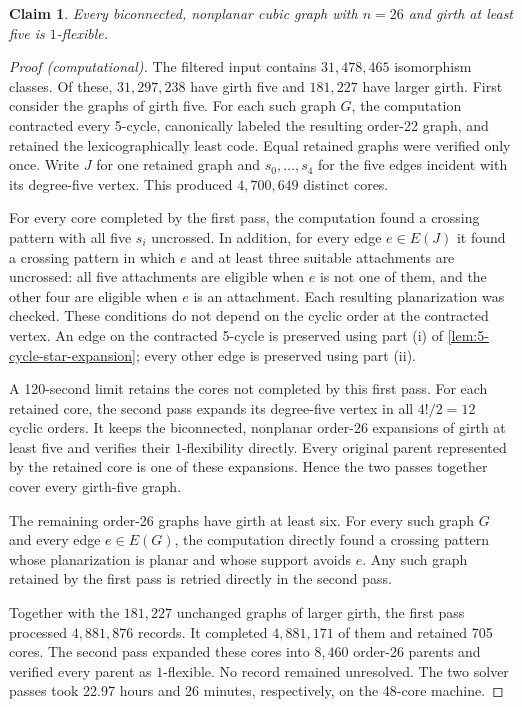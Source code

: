 \documentclass[a4paper,11pt]{article}
\theoremstyle{plain}
\newtheorem{claim}{Claim}
\theoremstyle{definition}  %
\begin{document}
\begin{claim}\label{clm:flexible26}
    Every biconnected, nonplanar cubic graph with $n=26$ and girth
    at least five is $1$-flexible.
\end{claim}

\begin{proof}[Proof (computational)]
    The filtered input contains $31{,}478{,}465$ isomorphism classes.  Of
    these, $31{,}297{,}238$ have girth five and $181{,}227$ have larger girth.
    First consider the graphs of girth five.  For each such graph $G$, the
    computation contracted every 5-cycle, canonically labeled the resulting
    order-22 graph, and retained the lexicographically least code.  Equal
    retained graphs were verified only once.  Write $J$ for one retained
    graph and $s_0,\ldots,s_4$ for the five edges incident with its
    degree-five vertex.  This produced $4{,}700{,}649$ distinct cores.

    For every core completed by the first pass, the computation found a
    crossing pattern with all five $s_i$ uncrossed.  In addition, for every
    edge $e\in E(J)$ it found a crossing pattern in which $e$ and at least
    three suitable attachments are uncrossed: all five attachments are
    eligible when $e$ is not one of them, and the other four are eligible
    when $e$ is an attachment.  Each resulting planarization was checked.
    These conditions do not depend on the cyclic order at the contracted
    vertex.  An edge on the contracted 5-cycle is preserved using part (i)
    of \cref{lem:5-cycle-star-expansion}; every other edge is preserved using
    part (ii).

    A 120-second limit retains the cores not completed by this first pass.
    For each retained core, the second pass expands its degree-five vertex in
    all \(4!/2=12\) cyclic orders.  It keeps the biconnected, nonplanar
    order-26 expansions of girth at least five and verifies their
    \(1\)-flexibility directly.  Every original parent represented by the
    retained core is one of these expansions.  Hence the two passes together
    cover every girth-five graph.

    The remaining order-26 graphs have girth at least six.  For every such
    graph $G$ and every edge $e\in E(G)$, the computation directly found a
    crossing pattern whose planarization is planar and whose support avoids
    $e$.  Any such graph retained by the first pass is retried
    directly in the second pass.

    Together with the $181{,}227$ unchanged graphs of larger girth, the first
    pass processed $4{,}881{,}876$ records.  It completed $4{,}881{,}171$ of
    them and retained 705 cores.  The second pass expanded these cores into
    $8{,}460$ order-26 parents and verified every parent as $1$-flexible.  No
    record remained unresolved.  The two solver passes took 22.97 hours and
    26 minutes, respectively, on the 48-core machine.
\end{proof}
\end{document}
